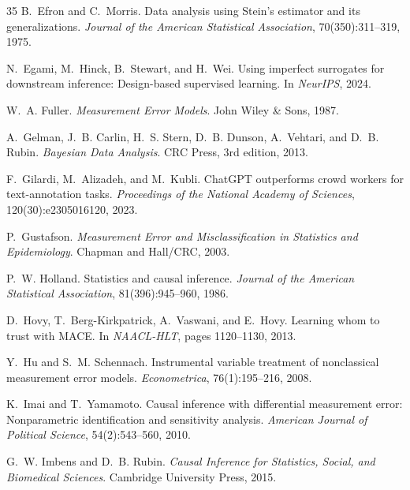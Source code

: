\documentclass[11pt,twocolumn]{article}
\theoremstyle{remark}
\begin{document}
\begin{thebibliography}{35}
B.~Efron and C.~Morris.
\newblock Data analysis using Stein's estimator and its generalizations.
\newblock \emph{Journal of the American Statistical Association}, 70(350):311--319, 1975.

N.~Egami, M.~Hinck, B.~Stewart, and H.~Wei.
\newblock Using imperfect surrogates for downstream inference: Design-based supervised learning.
\newblock In \emph{NeurIPS}, 2024.

W.~A. Fuller.
\newblock \emph{Measurement Error Models}.
\newblock John Wiley \& Sons, 1987.

A.~Gelman, J.~B. Carlin, H.~S. Stern, D.~B. Dunson, A.~Vehtari, and D.~B. Rubin.
\newblock \emph{Bayesian Data Analysis}.
\newblock CRC Press, 3rd edition, 2013.

F.~Gilardi, M.~Alizadeh, and M.~Kubli.
\newblock ChatGPT outperforms crowd workers for text-annotation tasks.
\newblock \emph{Proceedings of the National Academy of Sciences}, 120(30):e2305016120, 2023.

P.~Gustafson.
\newblock \emph{Measurement Error and Misclassification in Statistics and Epidemiology}.
\newblock Chapman and Hall/CRC, 2003.

P.~W. Holland.
\newblock Statistics and causal inference.
\newblock \emph{Journal of the American Statistical Association}, 81(396):945--960, 1986.

D.~Hovy, T.~Berg-Kirkpatrick, A.~Vaswani, and E.~Hovy.
\newblock Learning whom to trust with MACE.
\newblock In \emph{NAACL-HLT}, pages 1120--1130, 2013.

Y.~Hu and S.~M. Schennach.
\newblock Instrumental variable treatment of nonclassical measurement error models.
\newblock \emph{Econometrica}, 76(1):195--216, 2008.

K.~Imai and T.~Yamamoto.
\newblock Causal inference with differential measurement error: Nonparametric identification and sensitivity analysis.
\newblock \emph{American Journal of Political Science}, 54(2):543--560, 2010.

G.~W. Imbens and D.~B. Rubin.
\newblock \emph{Causal Inference for Statistics, Social, and Biomedical Sciences}.
\newblock Cambridge University Press, 2015.


\end{thebibliography}
\end{document}
